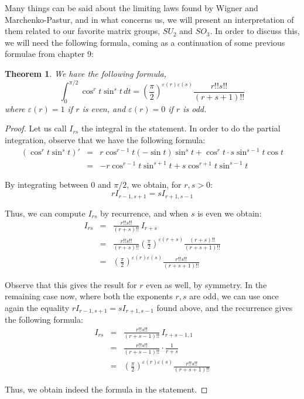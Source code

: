 \documentclass[12pt]{amsbook}
\newtheorem{theorem}{Theorem}[chapter]
\begin{document}
Many things can be said about the limiting laws found by Wigner and Marchenko-Pastur, and in what concerns us, we will present an interpretation of them related to our favorite matrix groups, $SU_2$ and $SO_3$. In order to discuss this, we will need the following formula, coming as a continuation of some previous formulae from chapter 9:

\begin{theorem}
We have the following formula,
$$\int_0^{\pi/2}\cos^rt\sin^st\,dt=\left(\frac{\pi}{2}\right)^{\varepsilon(r)\varepsilon(s)}\frac{r!!s!!}{(r+s+1)!!}$$
where $\varepsilon(r)=1$ if $r$ is even, and $\varepsilon(r)=0$ if $r$ is odd.
\end{theorem}

\begin{proof}
Let us call $I_{rs}$ the integral in the statement. In order to do the partial integration, observe that we have the following formula:
\begin{eqnarray*}
(\cos^rt\sin^st)'
&=&r\cos^{r-1}t(-\sin t)\sin^st+\cos^rt\cdot s\sin^{s-1}t\cos t\\
&=&-r\cos^{r-1}t\sin^{s+1}t+s\cos^{r+1}t\sin^{s-1}t
\end{eqnarray*}

By integrating between $0$ and $\pi/2$, we obtain, for $r,s>0$:
$$rI_{r-1,s+1}=sI_{r+1,s-1}$$

Thus, we can compute $I_{rs}$ by recurrence, and when $s$ is even we obtain:
\begin{eqnarray*}
I_{rs}
&=&\frac{r!!s!!}{(r+s)!!}\,I_{r+s}\\
&=&\frac{r!!s!!}{(r+s)!!}\left(\frac{\pi}{2}\right)^{\varepsilon(r+s)}\frac{(r+s)!!}{(r+s+1)!!}\\
&=&\left(\frac{\pi}{2}\right)^{\varepsilon(r)\varepsilon(s)}\frac{r!!s!!}{(r+s+1)!!}
\end{eqnarray*}

Observe that this gives the result for $r$ even as well, by symmetry. In the remaining case now, where both the exponents $r,s$ are odd, we can use once again the equality $rI_{r-1,s+1}=sI_{r+1,s-1}$ found above, and the recurrence gives the following formula:
\begin{eqnarray*}
I_{rs}
&=&\frac{r!!s!!}{(r+s-1)!!}\,I_{r+s-1,1}\\
&=&\frac{r!!s!!}{(r+s-1)!!}\cdot\frac{1}{r+s}\\
&=&\left(\frac{\pi}{2}\right)^{\varepsilon(r)\varepsilon(s)}\frac{r!!s!!}{(r+s+1)!!}
\end{eqnarray*}

Thus, we obtain indeed the formula in the statement.
\end{proof}
\end{document}
